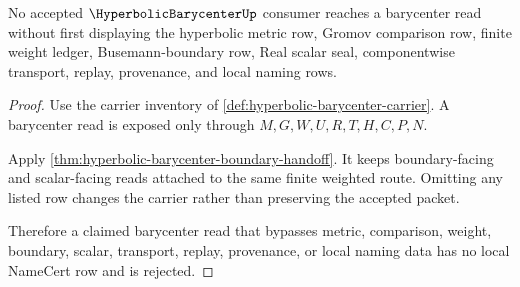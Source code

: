 \begin{theorem}
\label{thm:hyperbolic-barycenter-nonescape}
No accepted $\HyperbolicBarycenterUp$ consumer reaches a barycenter read without first displaying the hyperbolic metric row, Gromov comparison row, finite weight ledger, Busemann-boundary row, Real scalar seal, componentwise transport, replay, provenance, and local naming rows.
\end{theorem}
\begin{proof}
Use the carrier inventory of \autoref{def:hyperbolic-barycenter-carrier}. A barycenter read is exposed only through $M,G,W,U,R,T,H,C,P,N$.

Apply \autoref{thm:hyperbolic-barycenter-boundary-handoff}. It keeps boundary-facing and scalar-facing reads attached to the same finite weighted route. Omitting any listed row changes the carrier rather than preserving the accepted packet.

Therefore a claimed barycenter read that bypasses metric, comparison, weight, boundary, scalar, transport, replay, provenance, or local naming data has no local NameCert row and is rejected.
\end{proof}




